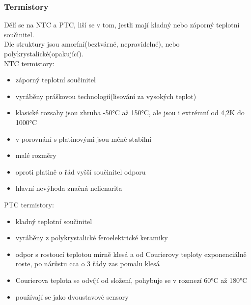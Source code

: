 \subsubsection*{Termistory}
Dělí se na NTC a PTC, liší se v tom, jestli mají kladný nebo záporný teplotní součinitel.\\
Dle struktury jsou amorfní(beztvárné, nepravidelné), nebo polykrystalické(opakující).\\
NTC termistory:
\begin{itemize}
    \item záporný teplotní součinitel
    \item vyráběny práškovou technologií(lisování za vysokých teplot)
    \item klasické rozsahy jsou zhruba -50°C až 150°C, ale jsou i extrémní od 4,2K do 1000°C 
    \item v porovnání s platinovými jsou méně stabilní 
    \item malé rozměry 
    \item oproti platině o řád vyšší součinitel odporu 
    \item hlavní nevýhoda značná nelienarita
\end{itemize}
PTC termistory:
\begin{itemize}
    \item kladný teplotní součinitel
    \item vyráběny z polykrystalické feroelektrické keramiky 
    \item odpor s rostoucí teplotou mírně klesá a od Courierovy teploty exponenciálně roste, po nárůstu cca o 3 řády zas pomalu klesá 
    \item Courierova teplota se odvíjí od složení, pohybuje se v rozmezí 60°C až 180°C 
    \item používají se jako dvoustavové sensory
\end{itemize}
\newpage

